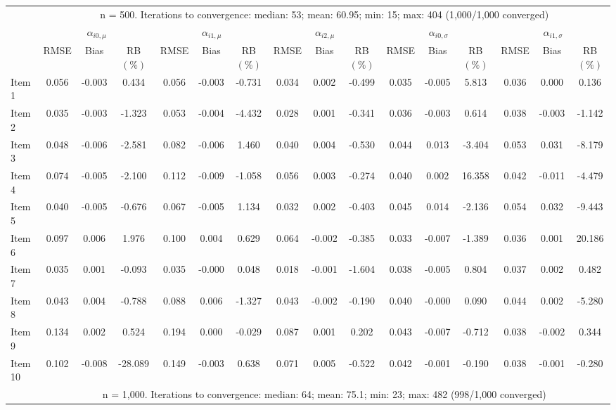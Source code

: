 \documentclass[11pt, a4paper]{article}
\begin{document}
\begin{table}[h!]
{{\begin{tabular}{lccccccccccccccc}
& \multicolumn{15}{c}{\multirow{2}{*}{n = 500. Iterations to convergence: median: 53; mean: 60.95; min: 15; max: 404 (1,000/1,000 converged)}} \\ & \\
\cmidrule(lr){2-16}
& \multicolumn{3}{c}{$\alpha_{i0,\mu}$} & \multicolumn{3}{c}{$\alpha_{i1,\mu}$} & \multicolumn{3}{c}{$\alpha_{i2,\mu}$} & \multicolumn{3}{c}{$\alpha_{i0,\sigma}$} & \multicolumn{3}{c}{$\alpha_{i1,\sigma}$}\\ 
& RMSE & Bias & RB $(\%)$ & RMSE & Bias & RB $(\%)$ & RMSE & Bias & RB $(\%)$ & RMSE & Bias & RB $(\%)$ & RMSE & Bias & RB $(\%)$ \\ \cmidrule(lr){2-4} \cmidrule(lr){5-7} \cmidrule(lr){8-10} \cmidrule(lr){11-13} \cmidrule(lr){14-16}
Item 1 & 0.056 & -0.003 & 0.434 & 0.056 & -0.003 & -0.731 & 0.034 & 0.002 & -0.499 & 0.035 & -0.005 & 5.813 & 0.036 & 0.000 & 0.136 \\ 
Item 2 & 0.035 & -0.003 & -1.323 & 0.053 & -0.004 & -4.432 & 0.028 & 0.001 & -0.341 & 0.036 & -0.003 & 0.614 & 0.038 & -0.003 & -1.142 \\ 
Item 3 & 0.048 & -0.006 & -2.581 & 0.082 & -0.006 & 1.460 & 0.040 & 0.004 & -0.530 & 0.044 & 0.013 & -3.404 & 0.053 & 0.031 & -8.179 \\ 
Item 4 & 0.074 & -0.005 & -2.100 & 0.112 & -0.009 & -1.058 & 0.056 & 0.003 & -0.274 & 0.040 & 0.002 & 16.358 & 0.042 & -0.011 & -4.479 \\ 
Item 5 & 0.040 & -0.005 & -0.676 & 0.067 & -0.005 & 1.134 & 0.032 & 0.002 & -0.403 & 0.045 & 0.014 & -2.136 & 0.054 & 0.032 & -9.443 \\ 
Item 6 & 0.097 & 0.006 & 1.976 & 0.100 & 0.004 & 0.629 & 0.064 & -0.002 & -0.385 & 0.033 & -0.007 & -1.389 & 0.036 & 0.001 & 20.186 \\ 
Item 7 & 0.035 & 0.001 & -0.093 & 0.035 & -0.000 & 0.048 & 0.018 & -0.001 & -1.604 & 0.038 & -0.005 & 0.804 & 0.037 & 0.002 & 0.482 \\ 
Item 8 & 0.043 & 0.004 & -0.788 & 0.088 & 0.006 & -1.327 & 0.043 & -0.002 & -0.190 & 0.040 & -0.000 & 0.090 & 0.044 & 0.002 & -5.280 \\ 
Item 9 & 0.134 & 0.002 & 0.524 & 0.194 & 0.000 & -0.029 & 0.087 & 0.001 & 0.202 & 0.043 & -0.007 & -0.712 & 0.038 & -0.002 & 0.344 \\ 
Item 10 & 0.102 & -0.008 & -28.089 & 0.149 & -0.003 & 0.638 & 0.071 & 0.005 & -0.522 & 0.042 & -0.001 & -0.190 & 0.038 & -0.001 & -0.280 \\ 
\cmidrule(lr){2-16}
& \multicolumn{15}{c}{\multirow{2}{*}{n = 1,000. Iterations to convergence: median: 64; mean: 75.1; min: 23; max: 482 (998/1,000 converged)}} \\ & \\

\end{tabular}}}
\end{table}
\end{document}
